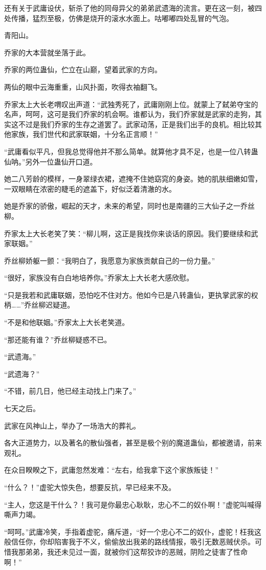 \begin{this_body}
还有关于武庸设伏，斩杀了他的同母异父的弟弟武遗海的流言。更在这一刻，被四处传播，猛烈至极，仿佛是烧开的滚水水面上。咕嘟嘟四处乱冒的气泡。

青阳山。

乔家的大本营就坐落于此。

乔家的两位蛊仙，伫立在山巅，望着武家的方向。

两仙的眼中云海重重，山风扑面，吹得衣袖翻飞。

乔家太上大长老喟叹出声道：“武独秀死了，武庸刚刚上位。就蒙上了弑弟夺宝的名声，呵呵，这可是我们乔家的机会啊。谁都认为，我们乔家就是武家的走狗，其实这不过是我们乔家的生存之道罢了。武家动荡，正是我们出手的良机。相比较其他家族，我们世代和武家联姻，十分名正言顺！”

“武庸看似平凡，但我总觉得他并不那么简单。就算他才具不足，也是一位八转蛊仙呐。”另外一位蛊仙开口道。

她二八芳龄的模样，一身翠绿衣裙，遮掩不住她窈窕的身姿。她的肌肤细嫩如雪，一双眼睛在浓密的睫毛的遮盖下，好似泛着清澈的水。

她是乔家的骄傲，崛起的天才，未来的希望，同时也是南疆的三大仙子之一乔丝柳。

乔家太上大长老笑了笑：“柳儿啊，这正是我找你来谈话的原因。我们要继续和武家联姻。”

乔丝柳娇躯一颤：“我明白了，我愿意为家族贡献自己的一份力量。”

“很好，家族没有白白地培养你。”乔家太上大长老大感欣慰。

“只是我若和武庸联姻，恐怕吃不住对方。他如今已是八转蛊仙，更执掌武家的权柄……”乔丝柳迟疑道。

“不是和他联姻。”乔家太上大长老笑道。

“那还能有谁？”乔丝柳疑惑不已。

“武遗海。”

“武遗海？”

“不错，前几日，他已经主动找上门来了。”

七天之后。

武家在风神山上，举办了一场浩大的葬礼。

各大正道势力，以及著名的散仙强者，甚至是极个别的魔道蛊仙，都被邀请，前来观礼。

在众目睽睽之下，武庸忽然发难：“左右，给我拿下这个家族叛徒！”

“什么？！”虚驼大惊失色，想要反抗，早已经来不及。

“主人，您这是干什么？！我可是你最忠心耿耿，忠心不二的奴仆啊！”虚驼叫喊得嘶声力竭。

“呵呵。”武庸冷笑，手指着虚驼，痛斥道，“好一个忠心不二的奴仆，虚驼！枉我这般信任你，你却陷害我于不义，偷偷放出我弟的路线情报，吸引无数恶贼伏杀。可惜我那弟弟，我还未见过一面，就被你们这帮狡诈的恶贼，阴险之徒害了性命啊！”


\end{this_body}
